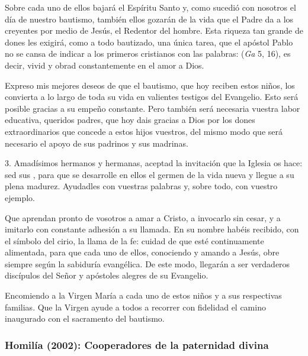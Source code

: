 \begin{body}
					Sobre cada uno de ellos bajará el Espíritu Santo y, como sucedió con nosotros el día de nuestro bautismo, también ellos gozarán de la vida que el Padre da a los creyentes por medio de Jesús, el Redentor del hombre. Esta riqueza tan grande de dones les exigirá, como a todo bautizado, una única tarea, que el apóstol Pablo no se cansa de indicar a los primeros cristianos con las palabras:  (\emph{Ga} 5, 16), es decir, vivid y obrad constantemente en el amor a Dios.
					
					Expreso mis mejores deseos de que el bautismo, que hoy reciben estos niños, los convierta a lo largo de toda su vida en valientes testigos del Evangelio. Esto será posible gracias a su empeño constante. Pero también será necesaria vuestra labor educativa, queridos padres, que hoy dais gracias a Dios por los dones extraordinarios que concede a estos hijos vuestros, del mismo modo que será necesario el apoyo de sus padrinos y sus madrinas.
					
					3. Amadísimos hermanos y hermanas, aceptad la invitación que la Iglesia os hace: sed sus , para que se desarrolle en ellos el germen de la vida nueva y llegue a su plena madurez. Ayudadles con vuestras palabras y, sobre todo, con vuestro ejemplo.
					
					Que aprendan pronto de vosotros a amar a Cristo, a invocarlo sin cesar, y a imitarlo con constante adhesión a su llamada. En su nombre habéis recibido, con el símbolo del cirio, la llama de la fe: cuidad de que esté continuamente alimentada, para que cada uno de ellos, conociendo y amando a Jesús, obre siempre según la sabiduría evangélica. De este modo, llegarán a ser verdaderos discípulos del Señor y apóstoles alegres de su Evangelio.
					
					Encomiendo a la Virgen María a cada uno de estos niños y a sus respectivas familias. Que la Virgen ayude a todos a recorrer con fidelidad el camino inaugurado con el sacramento del bautismo.					
				\end{body}
			
			\subsubsection{Homilía (2002): Cooperadores de la paternidad divina}
			
				
